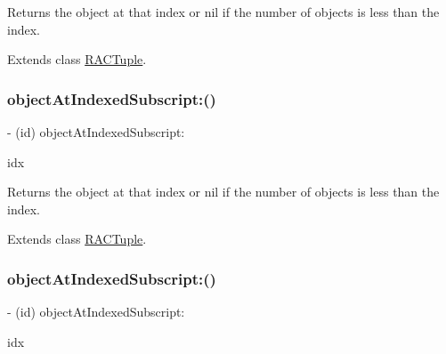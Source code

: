 Returns the object at that index or nil if the number of objects is less than the index. 

Extends class \mbox{\hyperlink{interface_r_a_c_tuple_ad2360332f752318fc924727c17eb67c9}{R\+A\+C\+Tuple}}.

\mbox{\label{category_r_a_c_tuple_07_object_subscripting_08_ad2360332f752318fc924727c17eb67c9}} 
\subsubsection{\texorpdfstring{object\+At\+Indexed\+Subscript\+:()}{objectAtIndexedSubscript:()}\hspace{0.1cm}{\footnotesize\ttfamily [2/3]}}
{\footnotesize\ttfamily -\/ (id) object\+At\+Indexed\+Subscript\+: \begin{DoxyParamCaption}\item[{(N\+S\+U\+Integer)}]{idx }\end{DoxyParamCaption}}

Returns the object at that index or nil if the number of objects is less than the index. 

Extends class \mbox{\hyperlink{interface_r_a_c_tuple_ad2360332f752318fc924727c17eb67c9}{R\+A\+C\+Tuple}}.

\mbox{\label{category_r_a_c_tuple_07_object_subscripting_08_ad2360332f752318fc924727c17eb67c9}} 
\subsubsection{\texorpdfstring{object\+At\+Indexed\+Subscript\+:()}{objectAtIndexedSubscript:()}\hspace{0.1cm}{\footnotesize\ttfamily [3/3]}}
{\footnotesize\ttfamily -\/ (id) object\+At\+Indexed\+Subscript\+: \begin{DoxyParamCaption}\item[{(N\+S\+U\+Integer)}]{idx }\end{DoxyParamCaption}}


